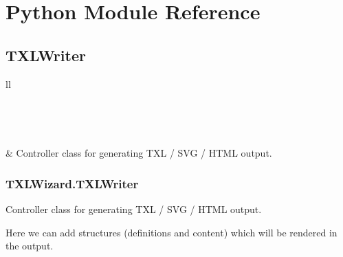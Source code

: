 \documentclass[letterpaper,10pt,english]{sphinxmanual}
\begin{document}
\chapter{Python Module Reference}
\label{Chapters/40_PythonModuleReference:python-module-reference}\label{Chapters/40_PythonModuleReference:pythonmodulereference}\label{Chapters/40_PythonModuleReference::doc}

\section{TXLWriter}
\label{Chapters/40_PythonModuleReference:txlwriter}
\begin{longtable}{ll}
\hline
\endfirsthead

%
{{}} \\
\hline
\endhead

\hline {} \\ \hline
\endfoot

\endlastfoot


{\hyperref[Chapters/PythonModuleReference/TXLWriter/TXLWizard.TXLWriter:module\string-TXLWizard.TXLWriter]{}}
 & 
Controller class for generating TXL / SVG / HTML output.
\\
\hline\end{longtable}



\subsection{TXLWizard.TXLWriter}
\label{Chapters/PythonModuleReference/TXLWriter/TXLWizard.TXLWriter:txlwizard-txlwriter}\label{Chapters/PythonModuleReference/TXLWriter/TXLWizard.TXLWriter:module-TXLWizard.TXLWriter}\label{Chapters/PythonModuleReference/TXLWriter/TXLWizard.TXLWriter::doc}
Controller class for generating TXL / SVG / HTML output.

Here we can add structures (definitions and content) which will be rendered in the output.
\end{document}
